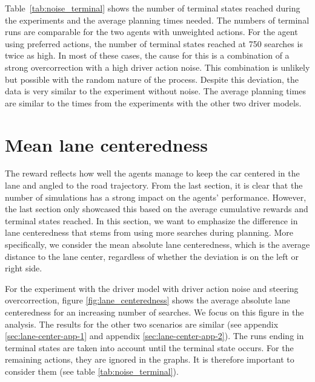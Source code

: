

\noindent
Table~\ref{tab:noise_terminal} shows the number of terminal states reached during the experiments and the average planning times needed. The numbers of terminal runs are comparable for the two agents with unweighted actions. For the agent using preferred actions, the number of terminal states reached at 750 searches is twice as high. In most of these cases, the cause for this is a combination of a strong overcorrection with a high driver action noise. This combination is unlikely but possible with the random nature of the process. Despite this deviation, the data is very similar to the experiment without noise. The average planning times are similar to the times from the experiments with the other two driver models.




\section{Mean lane centeredness}
\label{sec:centeredness}


The reward reflects how well the agents manage to keep the car centered in the lane and angled to the road trajectory. From the last section, it is clear that the number of simulations has a strong impact on the agents' performance. However, the last section only showcased this based on the average cumulative rewards and terminal states reached. In this section, we want to emphasize the difference in lane centeredness that stems from using more searches during planning. More specifically, we consider the mean absolute lane centeredness, which is the average distance to the lane center, regardless of whether the deviation is on the left or right side.

For the experiment with the driver model with driver action noise and steering overcorrection, figure \ref{fig:lane_centeredness} shows the average absolute lane centeredness for an increasing number of searches. We focus on this figure in the analysis. The results for the other two scenarios are similar (see appendix \ref{sec:lane-center-app-1} and appendix \ref{sec:lane-center-app-2}). The runs ending in terminal states are taken into account until the terminal state occurs. For the remaining actions, they are ignored in the graphs. It is therefore important to consider them (see table \ref{tab:noise_terminal}). 

